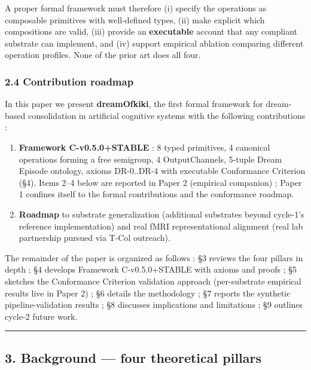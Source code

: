 \documentclass[
]{article}
\providecommand{\tightlist}{%
  \setlength{\itemsep}{0pt}\setlength{\parskip}{0pt}}
\begin{document}
A proper formal framework must therefore (i) specify the operations as
composable primitives with well-defined types, (ii) make explicit which
compositions are valid, (iii) provide an \textbf{executable} account
that any compliant substrate can implement, and (iv) support empirical
ablation comparing different operation profiles. None of the prior art
does all four.

\subsubsection{2.4 Contribution roadmap}\label{contribution-roadmap}

In this paper we present \textbf{dreamOfkiki}, the first formal
framework for dream-based consolidation in artificial cognitive systems
with the following contributions :

\begin{enumerate}
\def\labelenumi{\arabic{enumi}.}
\tightlist
\item
  \textbf{Framework C-v0.5.0+STABLE} : 8 typed primitives, 4 canonical
  operations forming a free semigroup, 4 OutputChannels, 5-tuple Dream
  Episode ontology, axioms DR-0..DR-4 with executable Conformance
  Criterion (§4). Items 2--4 below are reported in Paper 2 (empirical
  companion) ; Paper 1 confines itself to the formal contributions and
  the conformance roadmap.
\item
  \textbf{Roadmap} to substrate generalization (additional substrates
  beyond cycle-1's reference implementation) and real fMRI
  representational alignment (real lab partnership pursued via T-Col
  outreach).
\end{enumerate}

The remainder of the paper is organized as follows : §3 reviews the four
pillars in depth ; §4 develops Framework C-v0.5.0+STABLE with axioms and
proofs ; §5 sketches the Conformance Criterion validation approach
(per-substrate empirical results live in Paper 2) ; §6 details the
methodology ; §7 reports the synthetic pipeline-validation results ; §8
discusses implications and limitations ; §9 outlines cycle-2 future
work.

\begin{center}\rule{0.5\linewidth}{0.5pt}\end{center}

\subsection{3. Background --- four theoretical
pillars}\label{background-four-theoretical-pillars}
\end{document}
